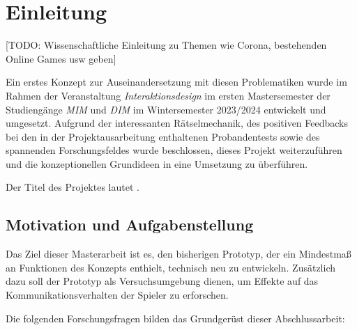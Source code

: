 \chapter{Einleitung}



[TODO: Wissenschaftliche Einleitung zu Themen wie Corona, bestehenden Online Games usw geben]

Ein erstes Konzept zur Auseinandersetzung mit diesen Problematiken wurde im Rahmen der Veranstaltung \emph{Interaktionsdesign} im ersten Mastersemester der Studiengänge\emph{ \ac{MIM}} und \emph{\ac{DIM}} im Wintersemester 2023/2024 entwickelt und umgesetzt. 
Aufgrund der interessanten Rätselmechanik, des positiven Feedbacks bei den in der Projektausarbeitung enthaltenen Probandentests sowie des spannenden Forschungsfeldes wurde beschlossen, dieses Projekt weiterzuführen und die konzeptionellen Grundideen in eine Umsetzung zu überführen.

Der Titel des Projektes lautet .

\section{Motivation und Aufgabenstellung}
Das Ziel dieser Masterarbeit ist es, den bisherigen Prototyp, der ein Mindestmaß an Funktionen des Konzepts enthielt, technisch neu zu entwickeln. Zusätzlich dazu soll der Prototyp als Versuchsumgebung dienen, um Effekte auf das Kommunikationsverhalten der Spieler zu erforschen. 

Die folgenden Forschungsfragen bilden das Grundgerüst dieser Abschlussarbeit:


